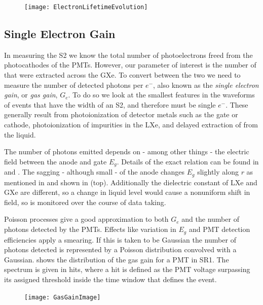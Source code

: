 \begin{figure}
\centering
\texttt{[image: ElectronLifetimeEvolution]}
\label{fig:det_char_elifetime_evolution}
\end{figure}



\subsection{Single Electron Gain}
\label{subsec:det_char_single_electron_gain}
In measuring the S2 we know the total number of photoelectrons freed from the photocathodes of the PMTs.  However, our parameter of
interest is the number of \electron that were extracted across the GXe.  To convert between the two we need to measure the number of
detected photons per $e^-$, also known as the \textit{single electron gain}, or \textit{gas gain}, $G_e$.  To do so we look at the
smallest features in the waveforms of events that have the width of an S2, and therefore must be single $e^-$.  These generally result
from photoionization of detector metals such as the gate or cathode, photoionization of impurities in the LXe, and delayed extraction
of \electron from the liquid.

The number of photons emitted depends on - among other things - the electric field between the anode and gate $E_g$.  Details of the
exact relation can be found in  and .  The sagging - although small - of the
anode changes $E_g$ slightly along $r$ as mentioned in  and shown in
 (top).  Additionally the dielectric constant of LXe and GXe are different, so a change in liquid level
would cause a nonuniform shift in field, so is monitored over the course of data taking.

Poisson processes give a good approximation to both $G_e$ and the number of photons detected by the PMTs.  Effects like variation in $E_g$
and PMT detection efficiencies apply a smearing.  If this is taken to be Gaussian the number of photons detected is represented by a
Poisson distribution convolved with a Gaussian.   shows the distribution of
the gas gain for a PMT in SR1.  The spectrum is given in hits, where a hit is defined as the PMT voltage surpassing its assigned threshold
inside the time window that defines the event.

\begin{figure}
\centering
\texttt{[image: GasGainImage]}
\label{fig:calibrations_single_electron_gain_num_photons}
\end{figure}



